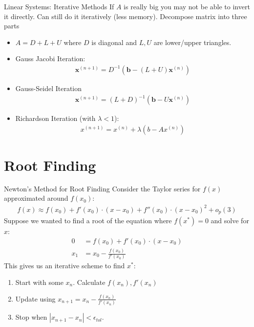 \documentclass[xcolor=pdftex,dvipsnames,table,mathserif,aspectratio=169]{beamer}
\begin{document}
\begin{frame}{Linear Systems: Iterative Methods}
If $A$ is really big you may not be able to invert it directly. Can still do it iteratively (less memory). Decompose matrix into three parts
\begin{itemize}
\item $A = D + L + U$ where $D$ is diagonal and $L,U$ are lower/upper triangles.
\item Gauss Jacobi Iteration:
\begin{align*}
\mathbf{x}^{(n+1)}=D^{-1}\left(\mathbf{b}-(L+U) \mathbf{x}^{(n)}\right)
\end{align*}
\item Gauss-Seidel Iteration
\begin{align*}
\mathbf{x}^{(n+1)}=(L+D)^{-1}\left(\mathbf{b}-U \mathbf{x}^{(n)}\right)
\end{align*}
\item Richardson Iteration (with $\lambda < 1$):
\begin{align*}
x^{(n+1)}=x^{(n)}+\lambda \left(b-A x^{(n)}\right)
\end{align*}
\end{itemize}
\end{frame}





\section{Root Finding} 

\begin{frame}{Newton's Method for Root Finding}
Consider the Taylor series for $f(x)$ approximated around $f(x_0)$:
\begin{align*}
f(x) \approx f(x_0) + f'(x_0) \cdot (x-x_0) + f''(x_0) \cdot (x-x_0)^2 + o_p(3)
\end{align*}
Suppose we wanted to find a \alert{root} of the equation where $f(x^{*})=0$ and solve for $x$:
\begin{align*}
0 &= f(x_0) + f'(x_0) \cdot (x-x_0) \\
x_1 &= x_0-\frac{f(x_0)}{f'(x_0)} 
\end{align*}
This gives us an \alert{iterative} scheme to find $x^{*}$:
\begin{enumerate}
\item Start with some $x_n$. Calculate $f(x_n),f'(x_n)$
\item Update using $x_{n+1} = x_n - \frac{f(x_n)}{f'(x_n)} $
\item Stop when $|x_{n+1}-x_{n}| < \epsilon_{tol}$.
\end{enumerate}
\end{frame}
\end{document}
